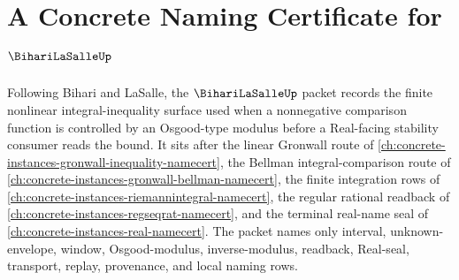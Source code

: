 \chapter{A Concrete Naming Certificate for $\BihariLaSalleUp$}
\label{ch:concrete-instances-bihari-la-salle-namecert}

Following Bihari and LaSalle, the $\BihariLaSalleUp$ packet records the finite nonlinear integral-inequality surface used when a nonnegative comparison function is controlled by an Osgood-type modulus before a Real-facing stability consumer reads the bound. It sits after the linear Gronwall route of \autoref{ch:concrete-instances-gronwall-inequality-namecert}, the Bellman integral-comparison route of \autoref{ch:concrete-instances-gronwall-bellman-namecert}, the finite integration rows of \autoref{ch:concrete-instances-riemannintegral-namecert}, the regular rational readback of \autoref{ch:concrete-instances-regseqrat-namecert}, and the terminal real-name seal of \autoref{ch:concrete-instances-real-namecert}. The packet names only interval, unknown-envelope, window, Osgood-modulus, inverse-modulus, readback, Real-seal, transport, replay, provenance, and local naming rows.

